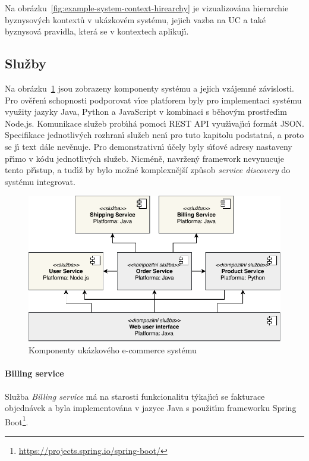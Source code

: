 Na obrázku~\ref{fig:example-system-context-hirearchy} je vizualizována
hierarchie byznysov\'ych kontextů v ukázkovém systému, jejich vazba na \gls{UC}
a také byznysová pravidla, která se v kontextech aplikuj\'{\i}.

\subsection{Služby}

Na obrázku~\ref{fig:example-system} jsou zobrazeny komponenty systému a jejich vzájemné závislosti.
Pro ověřen\'{\i} schopnosti podporovat v\'{\i}ce platforem byly pro implementaci systému využity
jazyky Java, Python a JavaScript v kombinaci s běhov\'ym prostřed\'{\i}m Node.js.
Komunikace služeb prob\'{\i}há pomoc\'{\i} \gls{REST} \gls{API} využ\'{\i}vaj\'{\i}c\'{\i} formát \gls{JSON}.
Specifikace jednotliv\'ych rozhran\'{\i} služeb nen\'{\i} pro tuto kapitolu podstatná, a proto se
j\'{\i} text dále nevěnuje. Pro demonstrativn\'{\i} účely byly s\'{\i}ťové adresy nastaveny př\'{\i}mo v kódu jednotliv\'ych
služeb. Nicméně, navržen\'y framework nevynucuje tento př\'{\i}stup, a tud\'{\i}ž by bylo možné komplexnější
způsob \textit{service discovery} do systému integrovat.

\begin{figure}
    \centering
    \includegraphics[keepaspectratio=true, width=0.8\linewidth]{figures/example-system.pdf}
    \caption{Komponenty ukázkového e-commerce systému}
    \label{fig:example-system}
\end{figure}

\paragraph{Billing service}

Služba \textit{Billing service} má na starosti funkcionalitu t\'ykaj\'{\i}c\'{\i} se fakturace objednávek
a byla implementována v jazyce Java s použit\'{\i}m frameworku Spring Boot\footnote{\url{https://projects.spring.io/spring-boot/}}.

